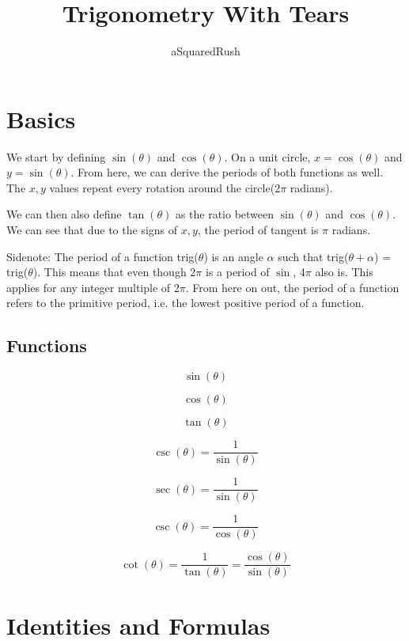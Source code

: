 \documentclass[11pt]{scrartcl}
\title{Trigonometry With Tears}
\author{aSquaredRush}
\date{}
\begin{document}
\maketitle

\section{Basics}
We start by defining $\sin(\theta)$ and $\cos(\theta)$. On a unit circle, $x=\cos(\theta)$ and $y=\sin(\theta)$. From here, we can derive the periods of both functions as well. The $x,y$ values repeat every rotation around the circle($2\pi$ radians). 
\vspace{5mm}

We can then also define $\tan(\theta)$ as the ratio between $\sin(\theta)$ and $\cos(\theta)$. We can see that due to the signs of $x,y$, the period of tangent is $\pi$ radians. 

\vspace{5mm}

Sidenote: The period of a function trig($\theta$) is an angle $\alpha$ such that
trig($\theta+\alpha$) = trig($\theta$). This means that even though 2$\pi$ is a period of $\sin$, 4$\pi$ also is. This applies for any integer multiple of 2$\pi$. From here on out, the period of a function refers to the primitive period, i.e. the lowest positive period of a function.    


\subsection{Functions}
\begin{definition}

$$\sin(\theta)$$


$$\cos(\theta)$$


$$\tan(\theta)$$


$$\csc(\theta) = \frac{1}{\sin(\theta)}$$


$$\sec{}(\theta) = \frac{1}{\sin(\theta)}$$


$$\csc(\theta) = \frac{1}{\cos(\theta)}$$


$$\cot(\theta) = \frac{1}{\tan(\theta)} = \frac{\cos(\theta)}{\sin(\theta)}$$
\end{definition}

\pagebreak
\section{Identities and Formulas}
\end{document}
